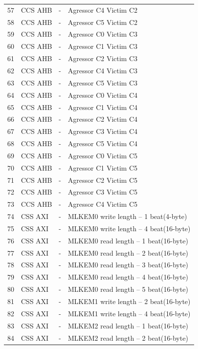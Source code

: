 \begin{center}
\begin{longtable}{|l|l|l|l|}
57  & CCS AHB &  -     &  Agressor C4 Victim C2\\
58  & CCS AHB &  -     &  Agressor C5 Victim C2\\
59  & CCS AHB &  -     &  Agressor C0 Victim C3\\
60  & CCS AHB &  -     &  Agressor C1 Victim C3\\
61  & CCS AHB &  -     &  Agressor C2 Victim C3\\
62  & CCS AHB &  -     &  Agressor C4 Victim C3\\
63  & CCS AHB &  -     &  Agressor C5 Victim C3\\
64  & CCS AHB &  -     &  Agressor C0 Victim C4\\
65  & CCS AHB &  -     &  Agressor C1 Victim C4\\
66  & CCS AHB &  -     &  Agressor C2 Victim C4\\
67  & CCS AHB &  -     &  Agressor C3 Victim C4\\
68  & CCS AHB &  -     &  Agressor C5 Victim C4\\
69  & CCS AHB &  -     &  Agressor C0 Victim C5\\
70  & CCS AHB &  -     &  Agressor C1 Victim C5\\
71  & CCS AHB &  -     &  Agressor C2 Victim C5\\
72  & CCS AHB &  -     &  Agressor C3 Victim C5\\
73  & CCS AHB &  -     &  Agressor C4 Victim C5\\
74  & CSS AXI &  -     &  MLKEM0 write length -- 1 beat(4-byte)\\
75  & CSS AXI &  -     &  MLKEM0 write length -- 4 beat(16-byte)\\
76  & CSS AXI &  -     &  MLKEM0 read  length -- 1 beat(16-byte)\\
77  & CSS AXI &  -     &  MLKEM0 read  length -- 2 beat(16-byte)\\
78  & CSS AXI &  -     &  MLKEM0 read  length -- 3 beat(16-byte)\\
79  & CSS AXI &  -     &  MLKEM0 read  length -- 4 beat(16-byte)\\
80  & CSS AXI &  -     &  MLKEM0 read  length -- 5 beat(16-byte)\\
81  & CSS AXI &  -     &  MLKEM1 write length -- 2 beat(16-byte)\\
82  & CSS AXI &  -     &  MLKEM1 write length -- 4 beat(16-byte)\\
83  & CSS AXI &  -     &  MLKEM2 read  length -- 1 beat(16-byte)\\
84  & CSS AXI &  -     &  MLKEM2 read  length -- 2 beat(16-byte)\\

\end{longtable}
\end{center}
